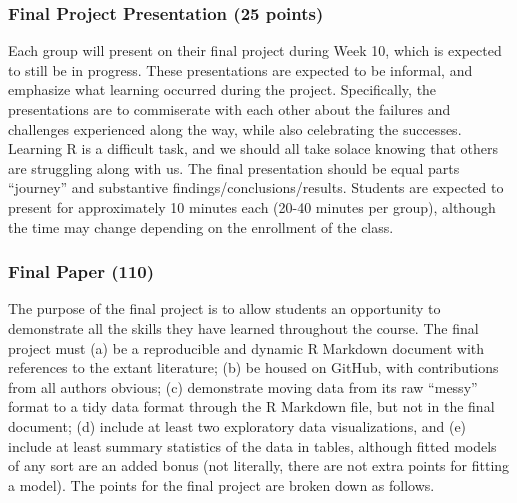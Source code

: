 \documentclass[
  letterpaper,
  DIV=11,
  numbers=noendperiod]{scrartcl}
\begin{document}
\hypertarget{final-project-presentation-25-points}{%
\subsubsection{Final Project Presentation (25
points)}\label{final-project-presentation-25-points}}

Each group will present on their final project during Week 10, which is
expected to still be in progress. These presentations are expected to be
informal, and emphasize what learning occurred during the project.
Specifically, the presentations are to commiserate with each other about
the failures and challenges experienced along the way, while also
celebrating the successes. Learning R is a difficult task, and we should
all take solace knowing that others are struggling along with us. The
final presentation should be equal parts ``journey'' and substantive
findings/conclusions/results. Students are expected to present for
approximately 10 minutes each (20-40 minutes per group), although the
time may change depending on the enrollment of the class.

\hypertarget{final-paper-110}{%
\subsubsection{Final Paper (110)}\label{final-paper-110}}

The purpose of the final project is to allow students an opportunity to
demonstrate all the skills they have learned throughout the course. The
final project must (a) be a reproducible and dynamic R Markdown document
with references to the extant literature; (b) be housed on GitHub, with
contributions from all authors obvious; (c) demonstrate moving data from
its raw ``messy'' format to a tidy data format through the R Markdown
file, but not in the final document; (d) include at least two
exploratory data visualizations, and (e) include at least summary
statistics of the data in tables, although fitted models of any sort are
an added bonus (not literally, there are not extra points for fitting a
model). The points for the final project are broken down as follows.
\end{document}
